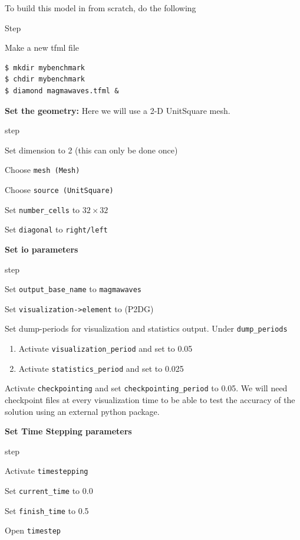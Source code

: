 To build this model in \TF{} from scratch, do the following
\begin{steps}{Step}
  \item Make a new tfml file
  \begin{lstlisting}[style=Bash]
$ mkdir mybenchmark
$ chdir mybenchmark
$ diamond magmawaves.tfml &
  \end{lstlisting}%
\item \textbf{Set the geometry:} Here we will use a 2-D UnitSquare mesh.
  \begin{steps}{step}
  \item Set dimension to 2 (this can only be done once)
  \item Choose \texttt{mesh (Mesh)} 
  \item Choose \texttt{source (UnitSquare)}
  \item Set \texttt{number\_cells} to $32\times32$
  \item Set \texttt{diagonal} to \texttt{right/left}
  \end{steps}
\item \textbf{Set io parameters}
  \begin{steps}{step}
  \item Set \texttt{output\_base\_name} to \texttt{magmawaves}
  \item Set \texttt{visualization->element} to (P2DG)
  \item Set dump-periods for visualization and statistics
    output.  Under \texttt{dump\_periods} 
    \begin{enumerate}
    \item Activate \texttt{visualization\_period} and set to
      0.05
    \item Activate \texttt{statistics\_period} and set to
      0.025
  \end{enumerate}
\item Activate \texttt{checkpointing} and set
  \texttt{checkpointing\_period} to 0.05.  We will need checkpoint
  files at every visualization time to be able to test the accuracy of
  the solution using an external python package.
  \end{steps}
\item \textbf{Set Time Stepping parameters}
  \begin{steps}{step}
  \item Activate \texttt{timestepping}
  \item Set \texttt{current\_time} to 0.0
  \item Set \texttt{finish\_time} to 0.5
  \item Open \texttt{timestep}

\end{steps}
\end{steps}
